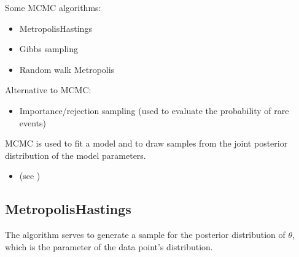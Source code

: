\documentclass[a4paper,12pt,english]{sphinxhowto}
\begin{document}
Some MCMC algorithms:
\begin{itemize}
\item {} 
Metropolis\sphinxhyphen{}Hastings

\item {} 
Gibbs sampling

\item {} 
Random walk Metropolis

\end{itemize}

Alternative to MCMC:
\begin{itemize}
\item {} 
Importance/rejection sampling (used to evaluate the probability of rare events)

\end{itemize}


MCMC is used to fit a model and to draw samples from the joint posterior distribution of the model parameters.
\begin{itemize}
\item {} 
(see {\hyperref[\detokenize{MCMC:bayes}]{}})

\end{itemize}



\subsection{Metropolis\sphinxhyphen{}Hastings}
\label{\detokenize{MCMC:metropolis-hastings}}
The  algorithm serves to generate a sample for the posterior distribution
of \(\theta\), which is the parameter of the data point’s distribution.

\end{document}
